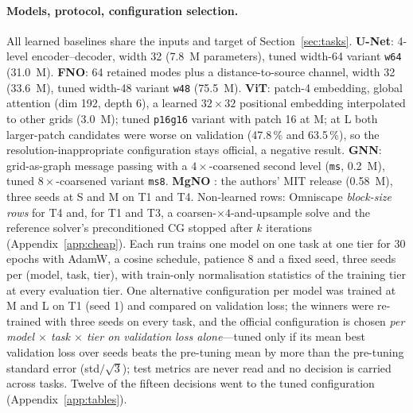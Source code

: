 \documentclass{article}
\newcommand{\code}[1]{\texttt{#1}}
\begin{document}
\paragraph{Models, protocol, configuration selection.} All learned baselines share the inputs and target of Section~\ref{sec:tasks}. \textbf{U-Net}: 4-level encoder--decoder, width 32 (7.8~M parameters), tuned width-64 variant \code{w64} (31.0~M). \textbf{FNO}: 64 retained modes plus a distance-to-source channel, width 32 (33.6~M), tuned width-48 variant \code{w48} (75.5~M). \textbf{ViT}: patch-4 embedding, global attention (dim 192, depth 6), a learned $32\times 32$ positional embedding interpolated to other grids (3.0~M); tuned \code{p16g16} variant with patch 16 at M; at L both larger-patch candidates were worse on validation (47.8\,\% and 63.5\,\%), so the resolution-inappropriate configuration stays official, a negative result. \textbf{GNN}: grid-as-graph message passing with a $4\times$-coarsened second level (\code{ms}, 0.2~M), tuned $8\times$-coarsened variant \code{ms8}. \textbf{MgNO} \citep{he2024}: the authors' MIT release (0.58~M), three seeds at S and M on T1 and T4. Non-learned rows: Omniscape \emph{block-size rows} for T4 and, for T1 and T3, a coarsen-$\times 4$-and-upsample solve and the reference solver's preconditioned CG stopped after $k$ iterations (Appendix~\ref{app:cheap}). Each run trains one model on one task at one tier for 30 epochs with AdamW, a cosine schedule, patience 8 and a fixed seed, three seeds per (model, task, tier), with train-only normalisation statistics of the training tier at every evaluation tier. One alternative configuration per model was trained at M and L on T1 (seed 1) and compared on validation loss; the winners were re-trained with three seeds on every task, and the official configuration is chosen \emph{per model $\times$ task $\times$ tier on validation loss alone}---tuned only if its mean best validation loss over seeds beats the pre-tuning mean by more than the pre-tuning standard error (std$/\sqrt{3}$); test metrics are never read and no decision is carried across tasks. Twelve of the fifteen decisions went to the tuned configuration (Appendix~\ref{app:tables}).
\end{document}
